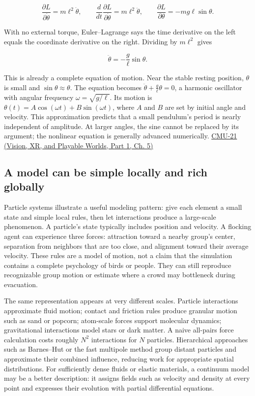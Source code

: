 \[
\frac{\partial L}{\partial\dot\theta}=m\ell^2\dot\theta,\qquad
\frac{d}{dt}\frac{\partial L}{\partial\dot\theta}=m\ell^2\ddot\theta,\qquad
\frac{\partial L}{\partial\theta}=-mg\ell\sin\theta.
\]

With no external torque, Euler--Lagrange says the time derivative on the left equals the coordinate derivative on the right. Dividing by \(m\ell^2\) gives

\[
\ddot\theta=-\frac{g}{\ell}\sin\theta.
\]

This is already a complete equation of motion. Near the stable resting position, \(\theta\) is small and \(\sin\theta\approx\theta\). The equation becomes \(\ddot\theta+\frac{g}{\ell}\theta=0\), a harmonic oscillator with angular frequency \(\omega=\sqrt{g/\ell}\). Its motion is \(\theta(t)=A\cos(\omega t)+B\sin(\omega t)\), where \(A\) and \(B\) are set by initial angle and velocity. This approximation predicts that a small pendulum's period is nearly independent of amplitude. At larger angles, the sine cannot be replaced by its argument; the nonlinear equation is generally advanced numerically. \href{../07-Vision-XR-and-Playable-Worlds-P01/main.pdf\#nameddest=04-visual-computing-ii-ch036-cmu-21---dynamics-and-time-integration}{CMU-21 (Vision, XR, and Playable Worlds, Part 1, Ch. 5)}

\subsection{A model can be simple locally and rich globally}\label{04-visual-computing-ii-ch029-a-model-can-be-simple-locally-and-rich-globally}

\hypertarget{04-visual-computing-ii-ch029-a-model-can-be-simple-locally-and-rich-globally}{}

Particle systems illustrate a useful modeling pattern: give each element a small state and simple local rules, then let interactions produce a large-scale phenomenon. A particle's state typically includes position and velocity. A flocking agent can experience three forces: attraction toward a nearby group's center, separation from neighbors that are too close, and alignment toward their average velocity. These rules are a model of motion, not a claim that the simulation contains a complete psychology of birds or people. They can still reproduce recognizable group motion or estimate where a crowd may bottleneck during evacuation.

The same representation appears at very different scales. Particle interactions approximate fluid motion; contact and friction rules produce granular motion such as sand or popcorn; atom-scale forces support molecular dynamics; gravitational interactions model stars or dark matter. A naive all-pairs force calculation costs roughly \(N^2\) interactions for \(N\) particles. Hierarchical approaches such as Barnes--Hut or the fast multipole method group distant particles and approximate their combined influence, reducing work for appropriate spatial distributions. For sufficiently dense fluids or elastic materials, a continuum model may be a better description: it assigns fields such as velocity and density at every point and expresses their evolution with partial differential equations.

